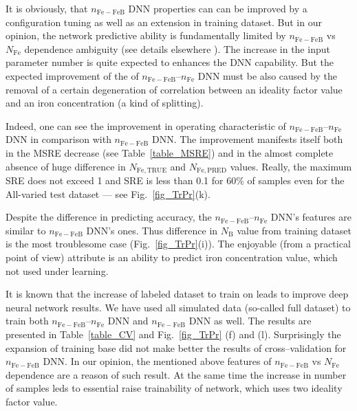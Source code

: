 \documentclass[journal]{IEEEtran}
\begin{document}
It is obviously, that $n_\mathrm{Fe-FeB}$ DNN  properties can can be improved by a configuration tuning as well as an extension in training dataset.
But in our opinion, the network predictive ability is fundamentally limited by $n_\mathrm{Fe-FeB}$ vs $N_\mathrm{Fe}$ dependence ambiguity (see details elsewhere \cite{OlikhJPS}).
The increase in the input parameter number is quite expected to enhances the DNN capability.
But the expected improvement of the of $n_\mathrm{Fe-FeB}$--$n_\mathrm{Fe}$ DNN must be also caused by the removal of a certain degeneration of correlation between an ideality factor value and an iron concentration (a kind of splitting).

Indeed, one can see the improvement in operating characteristic
of $n_\mathrm{Fe-FeB}$--$n_\mathrm{Fe}$ DNN in comparison with $n_\mathrm{Fe-FeB}$ DNN.
The improvement manifests itself both in the MSRE decrease (see Table~\ref{table_MSRE}) and
in the almost complete absence of huge
difference in $N_\mathrm{Fe,TRUE}$ and $N_\mathrm{Fe,PRED}$ values.
Really, the maximum SRE does not exceed 1 and SRE is less than 0.1 for 60\% of samples
even for the All-varied test dataset --- see Fig.~\ref{fig_TrPr}(k).

Despite the difference in predicting accuracy,
the $n_\mathrm{Fe-FeB}$--$n_\mathrm{Fe}$ DNN's features are similar to  $n_\mathrm{Fe-FeB}$ DNN's ones.
Thus difference in $N_\mathrm{B}$ value from training dataset is the most troublesome case
(Fig.~\ref{fig_TrPr}(i)).
The enjoyable (from a practical point of view) attribute is an ability to predict iron concentration value, which not used under learning.

It is known \cite{Keras} that the increase of labeled dataset to train on leads to improve  deep neural network results.
We have used all simulated data (so-called full dataset) to train both
$n_\mathrm{Fe-FeB}$--$n_\mathrm{Fe}$ DNN and $n_\mathrm{Fe-FeB}$ DNN as well.
The results are presented in Table~\ref{table_CV} and Fig.~\ref{fig_TrPr} (f) and (l).
Surprisingly the expansion of training base did not make better the results of cross--validation
for $n_\mathrm{Fe-FeB}$ DNN.
In our opinion, the mentioned above features of $n_\mathrm{Fe-FeB}$ vs $N_\mathrm{Fe}$ dependence
are a reason of such result.
At the same time the increase in number of samples leds to essential raise trainability of network, which uses two ideality factor value.


\end{document}
